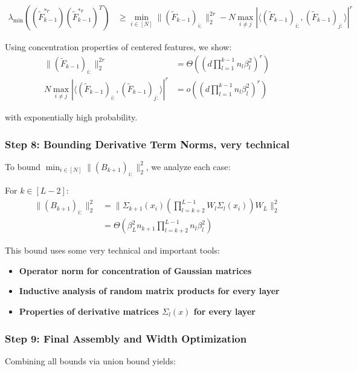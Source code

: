 \documentclass{article}
\newcommand{\evmin}[1]{\lambda_{\min}\left(#1\right)}
\begin{document}
\begin{align}
\evmin{(\tilde{F}_{k-1}^{*r})(\tilde{F}_{k-1}^{*r})^T} &\geq \min_{i \in [N]} \|(\tilde{F}_{k-1})_{i:}\|_2^{2r} - N \max_{i \neq j} |\langle (\tilde{F}_{k-1})_{i:}, (\tilde{F}_{k-1})_{j:} \rangle|^r
\end{align}

Using concentration properties of centered features, we show:
\begin{align}
\|(\tilde{F}_{k-1})_{i:}\|_2^{2r} &= \Theta\left(\left(d \prod_{l=1}^{k-1} n_l \beta_l^2\right)^r\right) \\
N \max_{i \neq j} |\langle (\tilde{F}_{k-1})_{i:}, (\tilde{F}_{k-1})_{j:} \rangle|^r &= o\left(\left(d \prod_{l=1}^{k-1} n_l \beta_l^2\right)^r\right)
\end{align}

with exponentially high probability.

\subsubsection{Step 8: Bounding Derivative Term Norms, very technical}

To bound $\min_{i \in [N]} \|(B_{k+1})_{i:}\|_2^2$, we analyze each case:

For $k \in [L-2]$:
\begin{align}
\|(B_{k+1})_{i:}\|_2^2 &= \|\Sigma_{k+1}(x_i) \left(\prod_{l=k+2}^{L-1} W_l \Sigma_l(x_i)\right) W_L\|_2^2 \\
&= \Theta\left(\beta_L^2 n_{k+1} \prod_{l=k+2}^{L-1} n_l \beta_l^2\right)
\end{align}

This bound uses some very technical and important tools:
\begin{itemize}
    \item \textbf{Operator norm for  concentration of Gaussian matrices}
    \item \textbf{Inductive analysis of random matrix products for every layer}
    \item \textbf{Properties of derivative matrices $\Sigma_l(x)$ for every layer}
\end{itemize}

\subsubsection{Step 9: Final Assembly and Width Optimization}

Combining all bounds via union bound yields:
\end{document}
